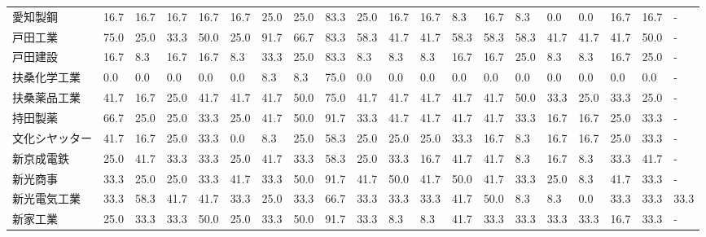\documentclass[a4paper，11pt]{jsarticle}
\begin{document}
\begin{longtable}[c]{lp{3mm}p{3mm}p{3mm}p{3mm}p{3mm}p{3mm}p{3mm}p{3mm}p{3mm}p{3mm}p{3mm}p{3mm}p{3mm}p{3mm}p{3mm}p{3mm}p{3mm}p{3mm}p{3mm}}
愛知製鋼            &   16.7 &   16.7 &      16.7 &      16.7 &       16.7 &   25.0 &   25.0 &   83.3 &    25.0 &    16.7 &   16.7 &   8.3 &   16.7 &     8.3 &     0.0 &   0.0 &  16.7 &  16.7 &     - \\
戸田工業            &   75.0 &   25.0 &      33.3 &      50.0 &       25.0 &   91.7 &   66.7 &   83.3 &    58.3 &    41.7 &   41.7 &  58.3 &   58.3 &    58.3 &    41.7 &  41.7 &  41.7 &  50.0 &     - \\
戸田建設            &   16.7 &    8.3 &      16.7 &      16.7 &        8.3 &   33.3 &   25.0 &   83.3 &     8.3 &     8.3 &    8.3 &  16.7 &   16.7 &    25.0 &     8.3 &   8.3 &  16.7 &  25.0 &     - \\
扶桑化学工業          &    0.0 &    0.0 &       0.0 &       0.0 &        0.0 &    8.3 &    8.3 &   75.0 &     0.0 &     0.0 &    0.0 &   0.0 &    0.0 &     0.0 &     0.0 &   0.0 &   0.0 &   0.0 &     - \\
扶桑薬品工業          &   41.7 &   16.7 &      25.0 &      41.7 &       41.7 &   41.7 &   50.0 &   75.0 &    41.7 &    41.7 &   41.7 &  41.7 &   41.7 &    50.0 &    33.3 &  25.0 &  33.3 &  25.0 &     - \\
持田製薬            &   66.7 &   25.0 &      25.0 &      33.3 &       25.0 &   41.7 &   50.0 &   91.7 &    33.3 &    41.7 &   41.7 &  41.7 &   41.7 &    33.3 &    16.7 &  16.7 &  25.0 &  33.3 &     - \\
文化シヤッター         &   41.7 &   16.7 &      25.0 &      33.3 &        0.0 &    8.3 &   25.0 &   58.3 &    25.0 &    25.0 &   25.0 &  33.3 &   16.7 &     8.3 &    16.7 &  16.7 &  25.0 &  33.3 &     - \\
新京成電鉄           &   25.0 &   41.7 &      33.3 &      33.3 &       25.0 &   41.7 &   33.3 &   58.3 &    25.0 &    33.3 &   16.7 &  41.7 &   41.7 &     8.3 &    16.7 &   8.3 &  33.3 &  41.7 &     - \\
新光商事            &   33.3 &   25.0 &      25.0 &      33.3 &       41.7 &   33.3 &   50.0 &   91.7 &    41.7 &    50.0 &   41.7 &  50.0 &   41.7 &    33.3 &    25.0 &   8.3 &  41.7 &  33.3 &     - \\
新光電気工業          &   33.3 &   58.3 &      41.7 &      41.7 &       33.3 &   25.0 &   33.3 &   66.7 &    33.3 &    33.3 &   33.3 &  41.7 &   50.0 &     8.3 &     8.3 &   0.0 &  33.3 &  33.3 &  33.3 \\
新家工業            &   25.0 &   33.3 &      33.3 &      50.0 &       25.0 &   33.3 &   50.0 &   91.7 &    33.3 &     8.3 &    8.3 &  41.7 &   33.3 &    33.3 &    33.3 &  33.3 &  16.7 &  33.3 &     - \\

\end{longtable}
\end{document}
